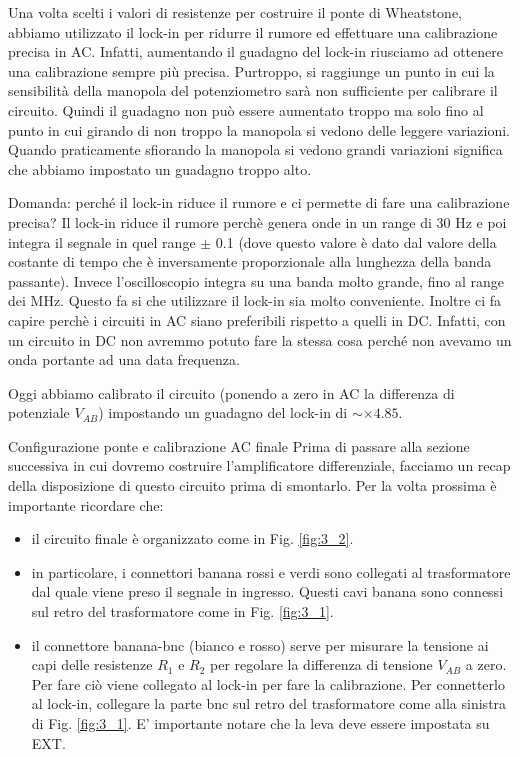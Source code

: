 \documentclass[../main/main.tex]{subfiles}
\begin{document}
Una volta scelti i valori di resistenze per costruire il ponte di Wheatstone, abbiamo utilizzato il lock-in per ridurre il rumore ed effettuare una calibrazione precisa in AC.
Infatti, aumentando il guadagno del lock-in riusciamo ad ottenere una calibrazione sempre più precisa. Purtroppo, si raggiunge un punto in cui la sensibilità della manopola del potenziometro sarà non sufficiente per calibrare il circuito. Quindi il guadagno non può essere aumentato troppo ma solo fino al punto in cui girando di non troppo la manopola si vedono delle leggere variazioni. Quando praticamente sfiorando la manopola si vedono grandi variazioni significa che abbiamo impostato un guadagno troppo alto.

Domanda: perché il lock-in riduce il rumore e ci permette di fare una calibrazione precisa?
Il lock-in riduce il rumore perchè genera onde in un range di 30 Hz e poi integra il segnale in quel range \( \pm \) 0.1 (dove questo valore è dato dal valore della costante di tempo che è inversamente proporzionale alla lunghezza della banda passante). Invece l'oscilloscopio integra su una banda molto grande, fino al range dei MHz. Questo fa si che utilizzare il lock-in sia molto conveniente. Inoltre ci fa capire perchè i circuiti in AC siano preferibili rispetto a quelli in DC. Infatti, con un circuito in DC non avremmo potuto fare la stessa cosa perché non avevamo un onda portante ad una data frequenza.

Oggi abbiamo calibrato il circuito (ponendo a zero in AC la differenza di potenziale \( V_{AB} \)) impostando un guadagno del lock-in di \( \sim \times  4.85 \).

\begin{remind}{Configurazione ponte e calibrazione AC finale}{}
    Prima di passare alla sezione successiva in cui dovremo costruire l'amplificatore differenziale, facciamo un recap della disposizione di questo circuito prima di smontarlo. Per la volta prossima è importante ricordare che:
    \begin{itemize}
    \item il circuito finale è organizzato come in Fig. \ref{fig:3_2}.
    \item in particolare, i connettori banana rossi e verdi sono collegati al trasformatore dal quale viene preso il segnale in ingresso. Questi cavi banana sono connessi sul retro del trasformatore come in Fig. \ref{fig:3_1}.
    \item il connettore banana-bnc (bianco e rosso) serve per misurare la tensione ai capi delle resistenze \( R_1 \) e \( R_2 \) per regolare la differenza di tensione \( V_{AB} \) a zero. Per fare ciò viene collegato al lock-in per fare la calibrazione. Per connetterlo al lock-in, collegare la parte bnc sul retro del trasformatore come alla sinistra di Fig. \ref{fig:3_1}. E' importante notare che la leva deve essere impostata su EXT.
    \end{itemize}
\end{remind}
\end{document}
